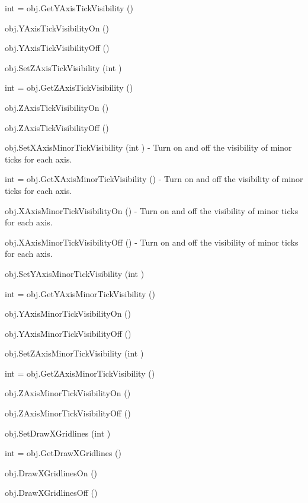 \begin{DoxyItemize}
\item {\ttfamily int = obj.\-Get\-Y\-Axis\-Tick\-Visibility ()}  
\item {\ttfamily obj.\-Y\-Axis\-Tick\-Visibility\-On ()}  
\item {\ttfamily obj.\-Y\-Axis\-Tick\-Visibility\-Off ()}  
\item {\ttfamily obj.\-Set\-Z\-Axis\-Tick\-Visibility (int )}  
\item {\ttfamily int = obj.\-Get\-Z\-Axis\-Tick\-Visibility ()}  
\item {\ttfamily obj.\-Z\-Axis\-Tick\-Visibility\-On ()}  
\item {\ttfamily obj.\-Z\-Axis\-Tick\-Visibility\-Off ()}  
\item {\ttfamily obj.\-Set\-X\-Axis\-Minor\-Tick\-Visibility (int )} -\/ Turn on and off the visibility of minor ticks for each axis.  
\item {\ttfamily int = obj.\-Get\-X\-Axis\-Minor\-Tick\-Visibility ()} -\/ Turn on and off the visibility of minor ticks for each axis.  
\item {\ttfamily obj.\-X\-Axis\-Minor\-Tick\-Visibility\-On ()} -\/ Turn on and off the visibility of minor ticks for each axis.  
\item {\ttfamily obj.\-X\-Axis\-Minor\-Tick\-Visibility\-Off ()} -\/ Turn on and off the visibility of minor ticks for each axis.  
\item {\ttfamily obj.\-Set\-Y\-Axis\-Minor\-Tick\-Visibility (int )}  
\item {\ttfamily int = obj.\-Get\-Y\-Axis\-Minor\-Tick\-Visibility ()}  
\item {\ttfamily obj.\-Y\-Axis\-Minor\-Tick\-Visibility\-On ()}  
\item {\ttfamily obj.\-Y\-Axis\-Minor\-Tick\-Visibility\-Off ()}  
\item {\ttfamily obj.\-Set\-Z\-Axis\-Minor\-Tick\-Visibility (int )}  
\item {\ttfamily int = obj.\-Get\-Z\-Axis\-Minor\-Tick\-Visibility ()}  
\item {\ttfamily obj.\-Z\-Axis\-Minor\-Tick\-Visibility\-On ()}  
\item {\ttfamily obj.\-Z\-Axis\-Minor\-Tick\-Visibility\-Off ()}  
\item {\ttfamily obj.\-Set\-Draw\-X\-Gridlines (int )}  
\item {\ttfamily int = obj.\-Get\-Draw\-X\-Gridlines ()}  
\item {\ttfamily obj.\-Draw\-X\-Gridlines\-On ()}  
\item {\ttfamily obj.\-Draw\-X\-Gridlines\-Off ()}  

\end{DoxyItemize}
